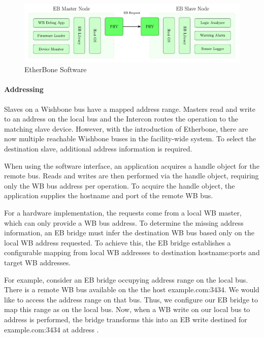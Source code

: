 \begin{figure}[H]
    \centering
    \includegraphics[width=15cm]{figures/EtherBone_2.pdf}
    \caption{EtherBone Software}
    \label{fig:EtherBone-2}
\end{figure}

\paragraph{Addressing}

Slaves on a Wishbone bus have a mapped address range. Masters read and write to an address on the local bus and the Intercon routes the operation to the matching slave device. 
However, with the introduction of Etherbone, there are now multiple reachable Wishbone buses in the facility-wide system. 
To select the destination slave, additional address information is required.

\vspace{5 mm}

\noindent When using the software interface, an application acquires a handle object for the remote bus. Reads and writes are then performed via the handle object, requiring only the WB bus address per operation. 
To acquire the handle object, the application supplies the hostname and port of the remote WB bus.

\vspace{5 mm}

\noindent For a hardware implementation, the requests come from a local WB master, which can only provide a WB bus address. 
To determine the missing address information, an EB bridge must infer the destination WB bus based only on the local WB address requested. 
To achieve this, the EB bridge establishes a configurable mapping from local WB addresses to destination hostname:ports and target WB addresses.

\vspace{5 mm}

\noindent For example, consider an EB bridge occupying address range  on the local bus. 
There is a remote WB bus available on the the host example.com:3434. 
We would like to access the address range  on that bus. Thus, we configure our EB bridge to map this range as  on the local bus. 
Now, when a WB write on our local bus to address  is performed, the bridge transforms this into an EB write destined for example.com:3434 at address .

